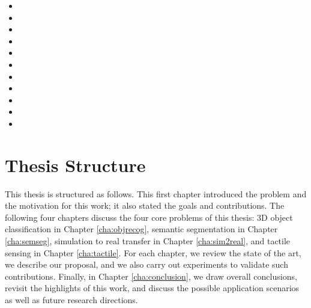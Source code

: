 \begin{itemize}
  \item {}
  \item {}
  \item {}
  \item {}
  \item {}
  \item {}
  \item {}
  \item {}
  \item {}
  \item {}
  \item {}
\end{itemize}

\section{Thesis Structure}
\label{cha:introduction:sec:structure}

This thesis is structured as follows. This first chapter introduced the problem and the motivation for this work; it also stated the goals and contributions. The following four chapters discuss the four core problems of this thesis: 3D object classification in Chapter \ref{cha:objrecog}, semantic segmentation in Chapter \ref{cha:semseg}, simulation to real transfer in Chapter \ref{cha:sim2real}, and tactile sensing in Chapter \ref{cha:tactile}. For each chapter, we review the state of the art, we describe our proposal, and we also carry out experiments to validate such contributions. Finally, in Chapter \ref{cha:conclusion}, we draw overall conclusions, revisit the highlights of this work, and discuss the possible application scenarios as well as future research directions.
